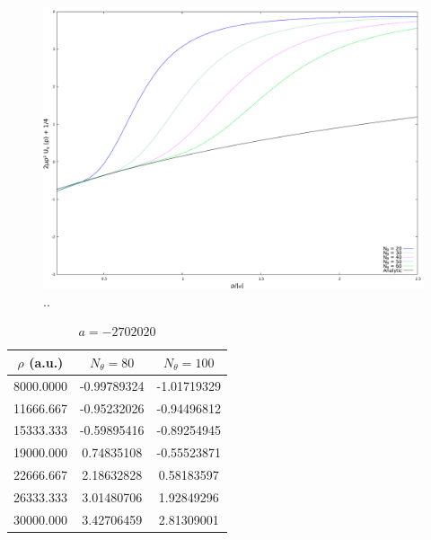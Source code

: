 \begin{figure}
	\includegraphics[width=\linewidth]{sn8720.pdf}
	\caption{..}
	\label{fig:res_7}
\end{figure}

\begin{table}[h!]
	\centering
	\begin{tabular}{||c c c||} 
		\hline
		$\rho$ (a.u.) & $N_{\theta}=80$ & $N_{\theta}=100$  \\ [0.5ex] 
		\hline\hline
		8000.0000   & -0.99789324     & -1.01719329  \\ 
		11666.667	 & -0.95232026   & -0.94496812  \\
		15333.333   & -0.59895416  & -0.89254945  \\
		19000.000   & 0.74835108  & -0.55523871   \\
		22666.667   & 2.18632828  & 0.58183597   \\
		26333.333   & 3.01480706  & 1.92849296  \\  
		30000.000   & 3.42706459 & 2.81309001  \\ [1ex] 
		\hline
	\end{tabular}
	\caption{$a = -2702020$}
	\label{table:Res_1}
\end{table} 
